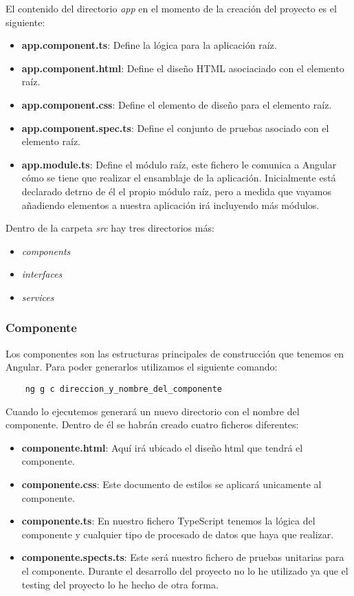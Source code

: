 El contenido del directorio \textit{app} en el momento de la creación del proyecto es el siguiente:

\begin{itemize}
    \item \textbf{app.component.ts}: Define la lógica para la aplicación raíz.
    \item \textbf{app.component.html}: Define el diseño HTML asociaciado con el elemento raíz.
    \item \textbf{app.component.css}: Define el elemento de diseño para el elemento raíz.
    \item \textbf{app.component.spec.ts}: Define el conjunto de pruebas asociado con el elemento raíz.
    \item \textbf{app.module.ts}: Define el módulo raíz, este fichero le comunica a Angular cómo se tiene que realizar el ensamblaje de la aplicación. Inicialmente está declarado detrno de él el propio módulo raíz, pero a medida que vayamos añadiendo elementos a nuestra aplicación irá incluyendo más módulos.
\end{itemize}

Dentro de la carpeta \textit{src} hay tres directorios más:
\begin{itemize}
    \item \textit{components}
    \item \textit{interfaces}
    \item \textit{services}
\end{itemize}

\subsubsection{Componente}
Los componentes son las estructuras principales de construcción que tenemos en Angular. Para poder generarlos utilizamos el siguiente comando:
\begin{verbatim}
    ng g c direccion_y_nombre_del_componente
\end{verbatim}
Cuando lo ejecutemos generará un nuevo directorio con el nombre del componente. Dentro de él se habrán creado cuatro ficheros diferentes:
\begin{itemize}
    \item \textbf{componente.html}: Aquí irá ubicado el diseño html que tendrá el componente.
    \item \textbf{componente.css}: Este documento de estilos se aplicará unicamente al componente.
    \item \textbf{componente.ts}: En nuestro fichero TypeScript tenemos la lógica del componente y cualquier tipo de procesado de datos que haya que realizar.
    \item \textbf{componente.spects.ts}: Este será nuestro fichero de pruebas unitarias para el componente. Durante el desarrollo del proyecto no lo he utilizado ya que el testing del proyecto lo he hecho de otra forma.
\end{itemize}


